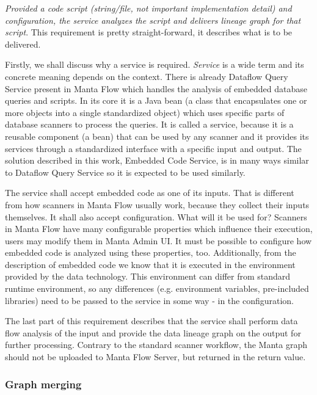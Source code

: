 \textit{Provided a code script (string/file, not important implementation detail) and configuration, the service analyzes the script and delivers lineage graph for that script}. This requirement is pretty straight-forward, it describes what is to be delivered.
\par
Firstly, we shall discuss why a service is required. \textit{Service} is a wide term and its concrete meaning depends on the context. There is already Dataflow Query Service present in Manta Flow which handles the analysis of embedded database queries and scripts. In its core it is a Java bean (a class that encapsulates one or more objects into a single standardized object) which uses specific parts of database scanners to process the queries. It is called a service, because it is a reusable component (a bean) that can be used by any scanner and it provides its services through a standardized interface with a specific input and output. The solution described in this work, Embedded Code Service, is in many ways similar to Dataflow Query Service so it is expected to be used similarly.
\par
The service shall accept embedded code as one of its inputs. That is different from how scanners in Manta Flow usually work, because they collect their inputs themselves. It shall also accept configuration. What will it be used for? Scanners in Manta Flow have many configurable properties which influence their execution, users may modify them in Manta Admin UI. It must be possible to configure how embedded code is analyzed using these properties, too. Additionally, from the description of embedded code we know that it is executed in the environment provided by the data technology. This environment can differ from standard runtime environment, so any differences (e.g. environment variables, pre-included libraries) need to be passed to the service in some way - in the configuration.
\par
The last part of this requirement describes that the service shall perform data flow analysis of the input and provide the data lineage graph on the output for further processing. Contrary to the standard scanner workflow, the Manta graph should not be uploaded to Manta Flow Server, but returned in the return value.

\subsubsection{Graph merging}

